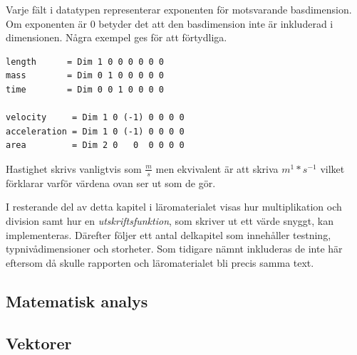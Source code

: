 Varje fält i datatypen representerar exponenten för motsvarande basdimension. Om exponenten är $0$ betyder det att den basdimension inte är inkluderad i dimensionen. Några exempel ges för att förtydliga.

\begin{lstlisting}[frame=none,belowskip=-0.5\baselineskip]
length      = Dim 1 0 0 0 0 0 0
mass        = Dim 0 1 0 0 0 0 0
time        = Dim 0 0 1 0 0 0 0

velocity     = Dim 1 0 (-1) 0 0 0 0
acceleration = Dim 1 0 (-1) 0 0 0 0
area         = Dim 2 0   0  0 0 0 0
\end{lstlisting}

Hastighet skrivs vanligtvis som $\frac{m}{s}$ men ekvivalent är att skriva $m^1*s^{-1}$ vilket förklarar varför värdena ovan ser ut som de gör.

I resterande del av detta kapitel i läromaterialet visas hur multiplikation och division samt hur en \textit{utskriftsfunktion}, som skriver ut ett värde snyggt, kan implementeras. Därefter följer ett antal delkapitel som innehåller testning, typnivådimensioner och storheter. Som tidigare nämnt inkluderas de inte här eftersom då skulle rapporten och läromaterialet bli precis samma text.

\subsection{Matematisk analys}

\subsection{Vektorer}

